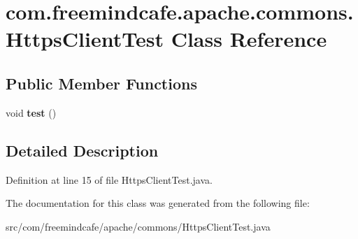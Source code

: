 \hypertarget{classcom_1_1freemindcafe_1_1apache_1_1commons_1_1_https_client_test}{}\section{com.\+freemindcafe.\+apache.\+commons.\+Https\+Client\+Test Class Reference}
\label{classcom_1_1freemindcafe_1_1apache_1_1commons_1_1_https_client_test}
\subsection*{Public Member Functions}
\begin{DoxyCompactItemize}
\item 
\hypertarget{classcom_1_1freemindcafe_1_1apache_1_1commons_1_1_https_client_test_a7925255f824e07337876ce202dfc67cc}{}void {\bfseries test} ()\label{classcom_1_1freemindcafe_1_1apache_1_1commons_1_1_https_client_test_a7925255f824e07337876ce202dfc67cc}

\end{DoxyCompactItemize}


\subsection{Detailed Description}


Definition at line 15 of file Https\+Client\+Test.\+java.



The documentation for this class was generated from the following file\+:\begin{DoxyCompactItemize}
\item 
src/com/freemindcafe/apache/commons/Https\+Client\+Test.\+java\end{DoxyCompactItemize}
